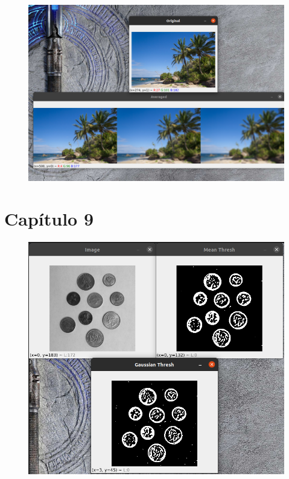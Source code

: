 \documentclass[12pt,letterpaper]{article}
\begin{document}
\begin{multicols}{2}
\begin{figure}[H]
\centering
\includegraphics[width = \columnwidth]{Resultado2_ch8.png}
\end{figure} 



\section{Capítulo 9}

\begin{figure}[H]
\centering
\includegraphics[width = \columnwidth]{Resultado_ch9_1.png}
\end{figure} 


\end{multicols}
\end{document}
